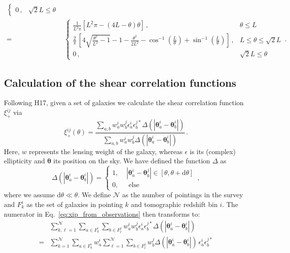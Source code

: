 \documentclass[referee]{aa} %
\renewcommand{\[}{\begin{equation}}
\renewcommand{\]}{\end{equation}}
\renewcommand{\rm}{\mathrm}
\def\inv{^{-1}}
\def\b#1{\bm{#1}}
\begin{document}
\begin{appendix}
\begin{align}
\begin{cases}
0\, , &\sqrt{2}L \leq\theta
\end{cases} \nonumber\\[10pt]
 = & \begin{cases}
\frac{1}{L^2 \pi}\left[L^2\pi - (4L-\theta) \theta\right]\, ,  & \theta \leq L \\[10pt]
\frac{2}{\pi}\,\left[4\sqrt{\frac{\theta^2}{L^2}-1} -1 - \frac{\theta^2}{2L^2} - \cos\inv\left(\frac{L}{\theta}\right) + \sin\inv\left(\frac{L}{\theta}\right)\right]\, ,  & L  \leq \theta \leq \sqrt{2}L \\[10pt]
0\, ,  & \sqrt{2}L \leq \theta
\end{cases}\, .
\end{align}

\subsection{Calculation of the shear correlation functions}
\label{sec:calc of xipm}
Following H17, given a set of galaxies we calculate the shear correlation function $\xi_+^{ij}$ via \begin{equation}
\xi^{ij}_+(\theta) = \frac{\sum_{a,b}w_a^iw_b^j\epsilon_a^i\epsilon_b^{j*}\Delta(|\b\theta_a^i-\b\theta_b^i|)}{\sum_{a,b}w_a^iw_b^j\Delta(|\b\theta_a^i-\b\theta_b^i|)}\, .
\label{eq:xip_from_observations}
\end{equation}
Here, $w$ represents the lensing weight of the galaxy, whereas $\epsilon$ is its (complex) ellipticity and $\b \theta$ its position on the sky. We have defined the function $\Delta$ as \[
\Delta(|\b\theta_a^i-\b\theta_b^i|) = \begin{cases}
1, \,\, & |\b\theta_a^i-\b\theta_b^j| \in [\theta,\theta+{\rm d}\theta] \\
0, & \text{ else}
\end{cases}\, ,
\]
where we assume ${\rm d}\theta \ll \theta$. We define $\mathcal{N}$ as the number of pointings in the survey and $F_k^i$ as the set of galaxies in pointing $k$ and tomographic redshift bin $i$. The numerator in Eq.~\eqref{eq:xip_from_observations} then transforms to: \begin{align}
& \sum_{k,\ell=1}^\mathcal{N} \sum_{a\in F_k^i}\sum_{b\in F_{\ell}^j} w_a^iw_b^j\epsilon_a^i\epsilon_b^{j*} \Delta(|\b\theta_a^i-\b\theta_b^i|) \nonumber\\
 = & \sum_{k=1}^\mathcal{N}\sum_{a\in F_k^i}w_a^i \sum_{\ell=1}^\mathcal{N} \sum_{b\in F_{\ell}^j} w_b^j \Delta(|\b\theta_a^i-\b\theta_b^i|)\, \epsilon_a^i\epsilon_b^{j*} \nonumber\\

\end{align}
\end{appendix}
\end{document}

